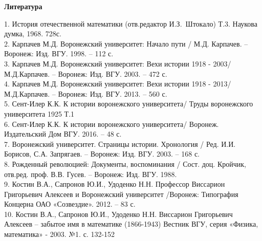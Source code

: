 \begin{center}{\bf Литература}
\end{center}
1. История отечественной математики (отв.редактор И.З.~Штокало) Т.3. Наукова думка, 1968. 728с.\\
2. Карпачев М.Д. Воронежский университет: Начало пути / М.Д. Карпачев. – Воронеж: Изд. ВГУ. 1998. – 112 с.\\
3. Карпачев М.Д. Воронежский университет: Вехи истории 1918 - 2003/ М.Д.Карпачев. – Воронеж: Изд. ВГУ. 2003. – 472 с.\\
4. Карпачев М.Д. Воронежский университет: Вехи истории 1918 - 2013/ М.Д.Карпачев. – Воронеж: Изд. ВГУ. 2013. – 560 с.\\
5. Сент-Илер К.К. К истории воронежского университета/ Труды воронежского университета 1925 Т.1\\
6. Сент-Илер К.К. К истории воронежского университета/ Воронеж. Издательский Дом ВГУ. 2016. – 48 с.\\
7. Воронежский университет. Страницы истории. Хронология / Ред. И.И. Борисов, С.А. Запрягаев. – Воронеж: Изд. ВГУ. 2003. – 168 с.\\
8. Рожденный революцией: Документы, воспоминания / Сост. доц. Кройчик, отв.ред. проф. В.В. Гусев. – Воронеж: Изд. ВГУ. 1988.\\
9. Костин В.А., Сапронов Ю.И., Удоденко Н.Н. Профессор Виссарион Григорьевич Алексеев и Воронежский университет /Воронеж: Типография Концерна ОАО «Созвездие». 2012. –  83 с.\\
10. Костин В.А., Сапронов Ю.И., Удоденко Н.Н. Виссарион Григорьевич Алексеев – забытое имя в математике (1866-1943) Вестник ВГУ, серия «Физика, математика» - 2003. №1.  с. 132-152\\



